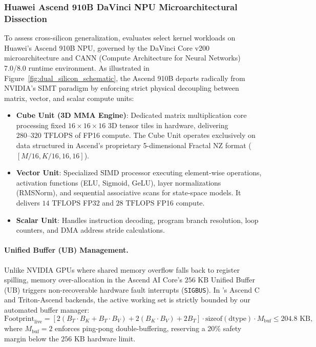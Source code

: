 \subsubsection{Huawei Ascend 910B DaVinci NPU Microarchitectural Dissection}
To assess cross-silicon generalization, \neuralops{} evaluates select kernel workloads on Huawei's Ascend 910B NPU, governed by the DaVinci Core v200 microarchitecture and CANN (Compute Architecture for Neural Networks) 7.0/8.0 runtime environment. As illustrated in Figure~\ref{fig:dual_silicon_schematic}, the Ascend 910B departs radically from NVIDIA's SIMT paradigm by enforcing strict physical decoupling between matrix, vector, and scalar compute units:
\begin{itemize}
    \item \textbf{Cube Unit (3D MMA Engine)}: Dedicated matrix multiplication core processing fixed $16 \times 16 \times 16$ 3D tensor tiles in hardware, delivering $280\text{--}320\text{ TFLOPS}$ of FP16 compute. The Cube Unit operates exclusively on data structured in Ascend's proprietary 5-dimensional Fractal NZ format ($[M/16, K/16, 16, 16]$).
    \item \textbf{Vector Unit}: Specialized SIMD processor executing element-wise operations, activation functions (ELU, Sigmoid, GeLU), layer normalizations (RMSNorm), and sequential associative scans for state-space models. It delivers $14\text{ TFLOPS}$ FP32 and $28\text{ TFLOPS}$ FP16 compute.
    \item \textbf{Scalar Unit}: Handles instruction decoding, program branch resolution, loop counters, and DMA address stride calculations.
\end{itemize}

\paragraph{Unified Buffer (UB) Management.} Unlike NVIDIA GPUs where shared memory overflow falls back to register spilling, memory over-allocation in the Ascend AI Core's $256\text{ KB}$ Unified Buffer (UB) triggers non-recoverable hardware fault interrupts (\texttt{SIGBUS}). In \neuralops{}'s Ascend C and Triton-Ascend backends, the active working set is strictly bounded by our automated buffer manager:
\begin{equation}
\label{eq:ascend_ub_budget}
\text{Footprint}_{\text{live}} = \left[ 2(B_T \cdot B_K + B_T \cdot B_V) + 2(B_K \cdot B_V) + 2 B_T \right] \cdot \text{sizeof}(\text{dtype}) \cdot M_{\text{buf}} \le 204.8\text{ KB},
\end{equation}
where $M_{\text{buf}} = 2$ enforces ping-pong double-buffering, reserving a 20\% safety margin below the $256\text{ KB}$ hardware limit.

